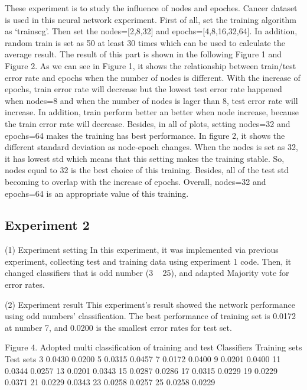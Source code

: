 \documentclass[a4paper, 12pt]{report}
\begin{document}
These experiment is to study the influence of nodes and epoches. Cancer dataset is used
in this neural network experiment. First of all, set the training algorithm as ‘trainscg’.
Then set the nodes=[2,8,32] and epochs=[4,8,16,32,64]. In addition, random train is set
as 50%
at least 30 times which can be used to calculate the average result. The result of this
part is shown in the following Figure 1 and Figure 2.
As we can see in Figure 1, it shows the relationship between train/test error rate and
epochs when the number of nodes is different. With the increase of epochs, train error
rate will decrease but the lowest test error rate happened when nodes=8 and when the
number of nodes is lager than 8, test error rate will increase. In addition, train perform
better an better when node increase, because the train error rate will decrease. Besides,
in all of plots, setting nodes=32 and epochs=64 makes the training has best performance. In figure 2, it shows the different standard deviation as node-epoch changes. When the
nodes is set as 32, it has lowest std which means that this setting makes the training
stable. So, nodes equal to 32 is the best choice of this training. Besides, all of the test
std becoming to overlap with the increase of epochs. Overall, nodes=32 and epochs=64 is an appropriate value of this training.

\subsection*{Experiment 2}
(1) Experiment setting
In this experiment, it was implemented via previous experiment, collecting test and training data using experiment 1 code. Then, it changed classifiers that is odd number (3 ~ 25), and adapted Majority vote for error rates. 

(2) Experiment result This experiment’s result showed the network performance using odd numbers’ classification. The best performance of training set is 0.0172 at number 7, and 0.0200 is the smallest error rates for test set.

Figure 4. Adopted multi classification of training and test Classifiers Training sets Test sets 3 0.0430 0.0200 5 0.0315 0.0457 7 0.0172 0.0400 9 0.0201 0.0400 11 0.0344 0.0257 13 0.0201 0.0343 15 0.0287 0.0286 17 0.0315 0.0229 19 0.0229 0.0371 21 0.0229 0.0343 23 0.0258 0.0257 25 0.0258 0.0229 
\end{document}
